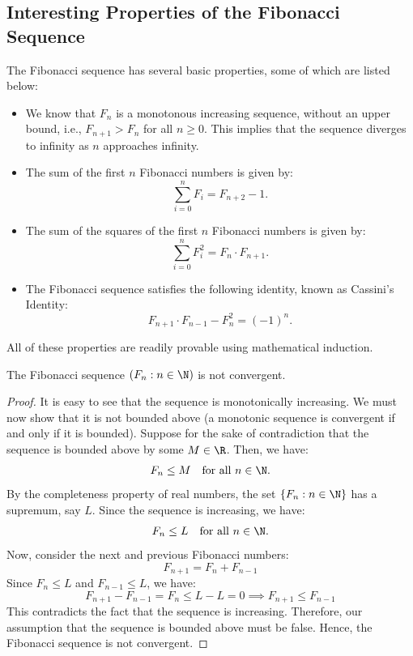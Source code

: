 \documentclass[openany]{book}
\begin{document}
\subsection{Interesting Properties of the Fibonacci Sequence}
The Fibonacci sequence has several basic properties, some of which are listed below:
\begin{itemize}
    \item We know that $F_n$ is a monotonous increasing sequence, without an upper bound, i.e., $F_{n+1} > F_n$ for all $n \geq 0$. This implies that the sequence diverges to infinity as $n$ approaches infinity.
    \item The sum of the first $n$ Fibonacci numbers is given by:
    \[
        \sum_{i=0}^{n} F_i = F_{n+2} - 1.
    \]
    \item The sum of the squares of the first $n$ Fibonacci numbers is given by:
    \[
        \sum_{i=0}^{n} F_i^2 = F_n \cdot F_{n+1}.
    \]
    \item The Fibonacci sequence satisfies the following identity, known as Cassini's Identity:
    \[
        F_{n+1} \cdot F_{n-1} - F_n^2 = (-1)^n.
    \]
\end{itemize}
All of these properties are readily provable using mathematical induction.
\begin{mytheorem}
    The Fibonacci sequence $(F_n : n \in \N)$ is not convergent.
\end{mytheorem}
\begin{proof}
    It is easy to see that the sequence is monotonically increasing. We must now show that it is not bounded above (a monotonic sequence is convergent if and only if it is bounded). Suppose for the sake of contradiction that the sequence is bounded above by some $M \in \R$. Then, we have:
    \[
        F_n \leq M \quad \text{for all } n \in \N.
    \]
    By the completeness property of real numbers, the set $\{F_n : n \in \N\}$ has a supremum, say $L$. Since the sequence is increasing, we have:
    \[
        F_n \leq L \quad \text{for all } n \in \N.
    \]
    Now, consider the next and previous Fibonacci numbers:
    \[
        F_{n+1} = F_n + F_{n-1}
    \]
    Since $F_n \leq L$ and $F_{n-1} \leq L$, we have:
    \[F_{n+1} - F_{n-1} = F_n \leq L - L = 0 \implies F_{n+1} \leq F_{n-1}\]
    This contradicts the fact that the sequence is increasing. Therefore, our assumption that the sequence is bounded above must be false. Hence, the Fibonacci sequence is not convergent.
\end{proof}
\end{document}
